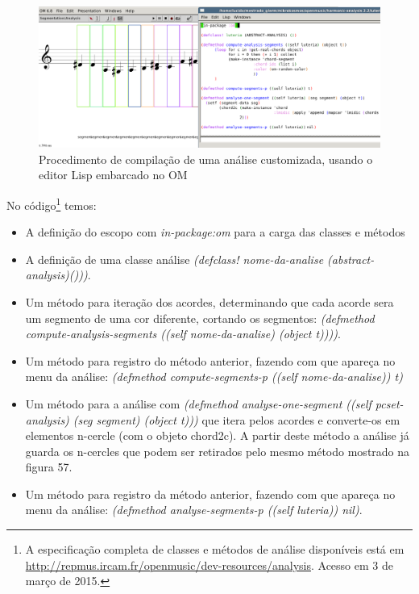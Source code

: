 \documentclass[
	12pt,				%
	openright,			%
	twoside,			%
	a4paper,			%
	english,			%
	french,				%
	spanish,			%
	brazil				%
	]{abntex2}
\begin{document}
				
\begin{figure}[!h]
	\caption{\label{fig_grafico}Procedimento de compilação de uma análise customizada, usando o editor Lisp embarcado no OM }
	\begin{center}
	    \includegraphics[scale=0.3]{OM_settheory/Analise_customizada.png}
	\end{center}
\end{figure}	

No código\footnote{A especificação completa de classes e métodos de análise disponíveis está em \url{http://repmus.ircam.fr/openmusic/dev-resources/analysis}. Acesso em 3 de março de 2015.} temos: 

\begin{itemize}

\item A definição do escopo com \textit{in-package:om} para a carga das classes e métodos

\item A definição de uma classe análise \textit{(defclass! nome-da-analise (abstract-analysis)()))}. 

\item Um método para iteração dos acordes, determinando que cada acorde sera um segmento de uma cor diferente, cortando os segmentos: \textit{(defmethod compute-analysis-segments ((self nome-da-analise) (object t))))}.

\item Um método para registro do método anterior, fazendo com que apareça no menu da análise: \textit{(defmethod compute-segments-p ((self nome-da-analise)) t)}

\item Um método para a análise com \textit{(defmethod analyse-one-segment ((self pcset-analysis) (seg segment) (object t)))} que itera pelos acordes e converte-os em elementos n-cercle (com o objeto chord2c). A partir deste método a análise já guarda os n-cercles que podem ser retirados pelo mesmo método mostrado na figura 57.

\item Um método para registro da método anterior, fazendo com que apareça no menu da análise: \textit{(defmethod analyse-segments-p ((self luteria)) nil)}.
				
\end{itemize}
			
\end{document}
